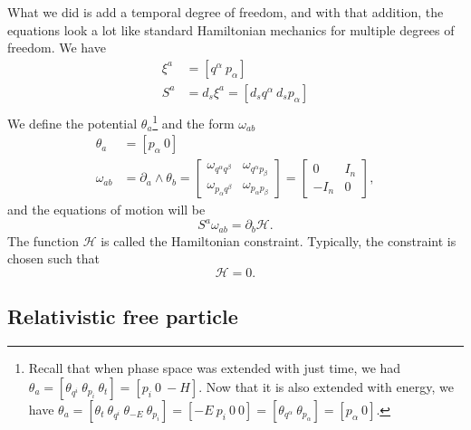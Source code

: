 What we did is add a temporal degree of freedom, and with that addition, the equations look a lot like standard Hamiltonian mechanics for multiple degrees of freedom. We have
\begin{equation}
	\begin{aligned}
		\xi^a &= [q^\alpha \ p_\alpha ] \\
		S^a &= d_s \xi^a = [d_s q^\alpha \ d_s p_\alpha] \\
	\end{aligned}
\end{equation}
We define the potential $\theta_a$\footnote{Recall that when phase space was extended with just time, we had $\theta_a = [\theta_{q^i} \ \theta_{p_i} \ \theta_t] = [p_i \ 0 \ -H]$. Now that it is also extended with energy, we have $\theta_a = [\theta_t \ \theta_{q^i} \ \theta_{-E} \ \theta_{p_i} ] = [-E \ p_i \ 0 \ 0] = [\theta_{q^\alpha} \ \theta_{p_\alpha} ] = [p_\alpha \ 0]$. } and the form $\omega_{ab}$
\begin{equation}\label{rp-cm-sf-extendedSymplecticForm}
	\tag{SF-FEPS}
	\begin{aligned}
		\theta_a &= [p_\alpha \ 0] \\
	\omega_{ab} &= \partial_a \wedge \theta_b = \left[\begin{array}{cc}
		\omega_{q^\alpha q^\beta} & \omega_{q^\alpha p_\beta} \\
		\omega_{p_\alpha q^\beta} & \omega_{p_\alpha p_\beta} 
	\end{array} \right]= \left[\begin{array}{cc}
		0 & I_n \\
		- I_n & 0 
	\end{array} \right],
	\end{aligned}
\end{equation}
and the equations of motion will be
\begin{equation}
	S^a \omega_{ab} = \partial_b \mathcal{H}.
\end{equation}
The function $\mathcal{H}$ is called the Hamiltonian constraint. Typically, the constraint is chosen such that
\begin{equation}
	\mathcal{H}=0.
\end{equation}

\subsection{Relativistic free particle}

